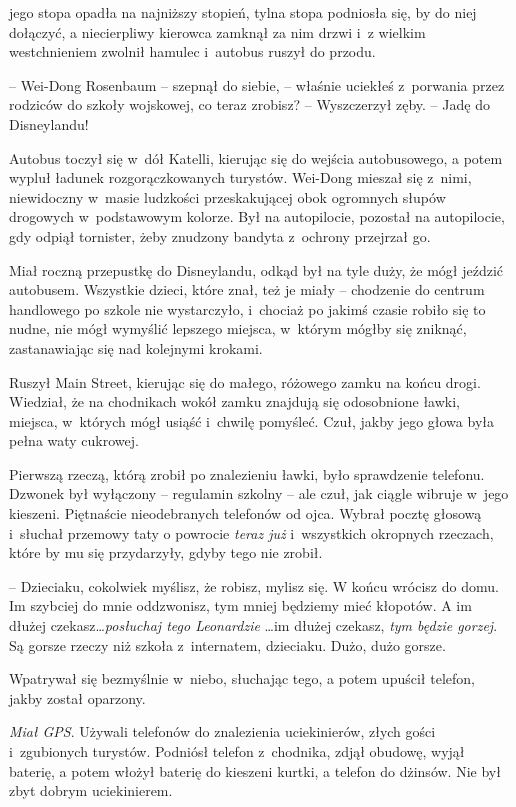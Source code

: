 \documentclass[oneside,polish,11pt,rmheadings]{mwbk}
\begin{document}
jego stopa opadła na najniższy stopień, tylna stopa podniosła się, by do niej dołączyć, a niecierpliwy kierowca zamknął za nim drzwi i~z wielkim westchnieniem zwolnił hamulec i~autobus ruszył do przodu. 


-- Wei-Dong Rosenbaum -- szepnął do siebie, -- właśnie uciekłeś z~porwania przez rodziców do szkoły wojskowej, co teraz zrobisz? -- Wyszczerzył zęby. -- Jadę do Disneylandu! 


Autobus toczył się w~dół Katelli, kierując się do wejścia autobusowego, a potem wypluł ładunek rozgorączkowanych turystów. Wei-Dong mieszał się z~nimi, niewidoczny w~masie ludzkości przeskakującej obok ogromnych słupów drogowych w~podstawowym kolorze. Był na autopilocie, pozostał na autopilocie, gdy odpiął tornister, żeby znudzony bandyta z~ochrony przejrzał go. 


Miał roczną przepustkę do Disneylandu, odkąd był na tyle duży, że mógł jeździć autobusem. Wszystkie dzieci, które znał, też je miały -- chodzenie do centrum handlowego po szkole nie wystarczyło, i~chociaż po jakimś czasie robiło się to nudne, nie mógł wymyślić lepszego miejsca, w~którym mógłby się zniknąć, zastanawiając się nad kolejnymi krokami. 


Ruszył Main Street, kierując się do małego, różowego zamku na końcu drogi. Wiedział, że na chodnikach wokół zamku znajdują się odosobnione ławki, miejsca, w~których mógł usiąść i~chwilę pomyśleć. Czuł, jakby jego głowa była pełna waty cukrowej. 


Pierwszą rzeczą, którą zrobił po znalezieniu ławki, było sprawdzenie telefonu. Dzwonek był wyłączony -- regulamin szkolny -- ale czuł, jak ciągle wibruje w~jego kieszeni. Piętnaście nieodebranych telefonów od ojca. Wybrał pocztę głosową i~słuchał przemowy taty o powrocie \textit{teraz już} i~wszystkich okropnych rzeczach, które by mu się przydarzyły, gdyby tego nie zrobił. 


-- Dzieciaku, cokolwiek myślisz, że robisz, mylisz się. W końcu wrócisz do domu. Im szybciej do mnie oddzwonisz, tym mniej będziemy mieć kłopotów. A im dłużej czekasz\ldots  \textit{posłuchaj tego Leonardzie }\ldots  im dłużej czekasz, \textit{tym będzie gorzej}. Są gorsze rzeczy niż szkoła z~internatem, dzieciaku. Dużo, dużo gorsze. 


Wpatrywał się bezmyślnie w~niebo, słuchając tego, a potem upuścił telefon, jakby został oparzony. 


\textit{Miał GPS}. Używali telefonów do znalezienia uciekinierów, złych gości i~zgubionych turystów. Podniósł telefon z~chodnika, zdjął obudowę, wyjął baterię, a potem włożył baterię do kieszeni kurtki, a telefon do dżinsów. Nie był zbyt dobrym uciekinierem. 
\end{document}
